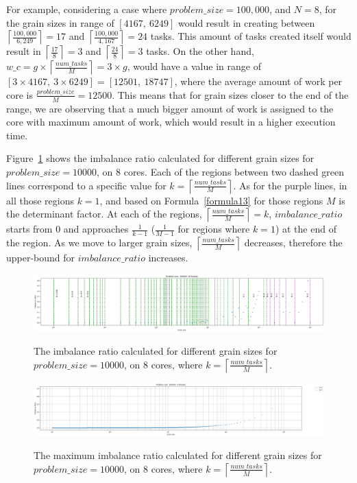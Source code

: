 \vspace{\baselineskip}
For example, considering a case where $problem\_{size}=100,000$, and $N=8$, for the grain sizes in range of $[4167,\:6249]$ would result in creating between $\left \lceil{\frac{100,000}{6,249}}\right \rceil=17$ and  $\left \lceil{\frac{100,000}{4,167}}\right \rceil=24$ tasks. This amount of tasks created itself would result in $\left \lceil{\frac{17}{8}}\right \rceil=3$ and  $\left \lceil{\frac{24}{8}}\right \rceil=3$ tasks.
On the other hand, $w\_c=g\times{\left \lceil{\frac{num\_{tasks}}{M}}\right \rceil}=3\times{g}$, would have a value in range of $[3\times4167,\:3\times6249]=[12501,\: 18747]$, where the average amount of work per core is $\frac{problem\_{size}}{M}=12500$. This means that for grain sizes closer to the end of the range, we are observing that a much bigger amount of work is assigned to the core with maximum amount of work, which would result in a higher execution time. 

Figure~\ref{fig38} shows the imbalance ratio calculated for different grain sizes for $problem\_size=10000$, on 8 cores. Each of the regions between two dashed green lines correspond to a specific value for $k=\left\lceil{\frac{num\_{tasks}}{M}}\right \rceil$. As for the purple lines, in all those regions $k=1$, and based on Formula~\ref{formula13} for those regions $M$ is the determinant factor.
At each of the regions, $\left\lceil{\frac{num\_{tasks}}{M}}\right \rceil=k$,  $imbalance\_{ratio}$ starts from $0$ and approaches $\frac{1}{k-1}$ ($\frac{1}{M-1}$ for regions where $k=1$) at the end of the region. As we move to larger grain sizes, $\left\lceil{\frac{num\_{tasks}}{M}}\right \rceil$ decreases, therefore the upper-bound for $imbalance\_{ratio}$ increases.   


\vspace{\baselineskip}	
\begin{figure}[H]
	\centering
	{\includegraphics[scale=.25]{images/hpx_for_loop/w_c.png}}
	\caption{The imbalance ratio calculated for different grain sizes for $problem\_size=10000$, on 8 cores, where $k=\left\lceil{\frac{num\_{tasks}}{M}}\right \rceil$.}\label{fig38}		
\end{figure}


\vspace{\baselineskip}	
\begin{figure}[H]
	\centering
	{\includegraphics[scale=.45]{images/hpx_for_loop/max_w_c.png}}
	\caption{The maximum imbalance ratio calculated for different grain sizes for $problem\_size=10000$, on 8 cores, where $k=\left\lceil{\frac{num\_{tasks}}{M}}\right \rceil$.}\label{fig36}		
\end{figure}

